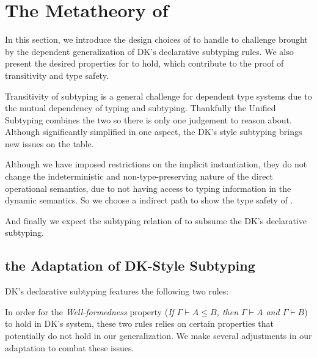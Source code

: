 \section{The Metatheory of \name}

In this section, we introduce the design choices of \name to handle to challenge
brought by the dependent generalization of DK's declarative subtyping rules.
We also present the desired properties for \name to hold, which contribute to
the proof of transitivity and type safety.

Transitivity of subtyping is a general challenge for dependent type systems due
to the mutual dependency of typing and subtyping. Thankfully the Unified Subtyping
combines the two so there is only one judgement to reason about. Although
significantly simplified in one aspect, the DK's style subtyping brings new issues
on the table.

Although we have imposed restrictions on the implicit instantiation, they do not
change the indeterministic and non-type-preserving nature of the direct operational
semantics, due to not having access to typing information in the dynamic semantics.
So we choose a indirect path to show the type safety of \name.

And finally we expect the subtyping relation of \name to subsume the DK's
declarative subtyping.

\subsection{the Adaptation of DK-Style Subtyping}
\label{sec:adaptation}

DK's declarative subtyping features the following two rules:


In order for the \emph{Well-formedness}\cite{dunfield2013lemmas} property
(\emph{If $\Gamma \vdash A \le B$, then $\Gamma \vdash A$ and $\Gamma \vdash B$})
to hold in DK's system, these two rules relies on certain properties that
potentially do not hold in our generalization. We make several adjustments
in our adaptation to combat these issues.

